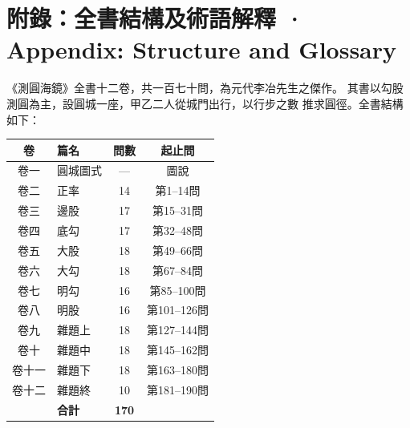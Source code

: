 \documentclass[9pt,a4paper]{article}
\begin{document}
\newpage

\section*{附錄：全書結構及術語解釋 · Appendix: Structure and Glossary}

\noindent\begin{minipage}[t]{0.48\textwidth}
《測圓海鏡》全書十二卷，共一百七十問，為元代李冶先生之傑作。
其書以勾股測圓為主，設圓城一座，甲乙二人從城門出行，以行步之數
推求圓徑。全書結構如下：

\vspace{0.2cm}
\begin{center}
\begin{tabular}{clcc}
\toprule
\textbf{卷} & \textbf{篇名} & \textbf{問數} & \textbf{起止問} \\
\midrule
卷一 & 圓城圖式 & --- & 圖說 \\
卷二 & 正率 & 14 & 第1--14問 \\
卷三 & 邊股 & 17 & 第15--31問 \\
\rowcolor{gray!15}
卷四 & 底勾 & 17 & 第32--48問 \\
\rowcolor{gray!15}
卷五 & 大股 & 18 & 第49--66問 \\
\rowcolor{gray!15}
卷六 & 大勾 & 18 & 第67--84問 \\
卷七 & 明勾 & 16 & 第85--100問 \\
卷八 & 明股 & 16 & 第101--126問 \\
卷九 & 雜題上 & 18 & 第127--144問 \\
卷十 & 雜題中 & 18 & 第145--162問 \\
卷十一 & 雜題下 & 18 & 第163--180問 \\
卷十二 & 雜題終 & 10 & 第181--190問 \\
\midrule
 & \textbf{合計} & \textbf{170} & \\
\bottomrule
\end{tabular}
\end{center}
\end{minipage}%
\hfill%
\end{document}
